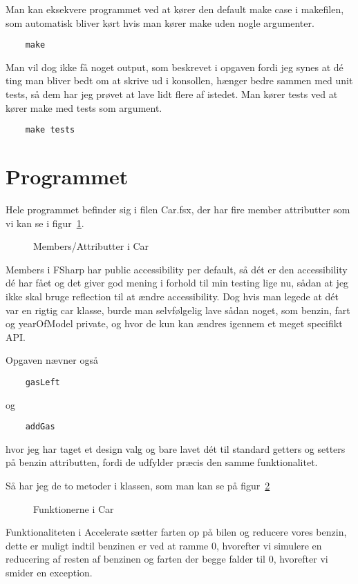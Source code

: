 Man kan eksekvere programmet ved at kører den default make case i makefilen,
som automatisk bliver kørt hvis man kører make uden nogle argumenter.
\begin{lstlisting}
    make
\end{lstlisting}
Man vil dog ikke få noget output,
som beskrevet i opgaven fordi jeg synes at dé ting man bliver bedt om at skrive ud i konsollen,
hænger bedre sammen med unit tests, så dem har jeg prøvet at lave lidt flere af istedet.
Man kører tests ved at kører make med tests som argument.
\begin{lstlisting}
    make tests
\end{lstlisting}

\section{Programmet}
Hele programmet befinder sig i filen Car.fsx, der har fire member attributter
som vi kan se i figur~\ref{fig:MemberAttributesInCar}.
\begin{figure}[!htb]
  \lstset{language=FSharp}
  \text{
    
  }
  \caption{Members/Attributter i Car}
\label{fig:MemberAttributesInCar}
\end{figure}

Members i FSharp har public accessibility per default, så dét er den accessibility dé har
fået og det giver god mening i forhold til min testing lige nu,
sådan at jeg ikke skal bruge reflection til at ændre accessibility.
Dog hvis man legede at dét var en rigtig car klasse,
burde man selvfølgelig lave sådan noget, som benzin,
fart og yearOfModel private, og hvor de kun kan ændres igennem et meget specifikt API.

Opgaven nævner også 

\begin{lstlisting}
    gasLeft
\end{lstlisting}

 og 

\begin{lstlisting}
    addGas
\end{lstlisting}

hvor jeg har taget et design valg
og bare lavet dét til standard getters og setters på benzin attributten,
fordi de udfylder præcis den samme funktionalitet.

Så har jeg de to metoder i klassen, som man kan se på figur~\ref{fig:MethodsInCar}
\begin{figure}[!htb]
  \lstset{language=FSharp}
  \text{
    
  }
  \caption{Funktionerne i Car}
\label{fig:MethodsInCar}
\end{figure}

Funktionaliteten i Accelerate sætter farten op på bilen og reducere vores benzin,
dette er muligt
indtil benzinen er ved at ramme 0, hvorefter vi simulere en reducering af resten
af benzinen og farten der begge falder til 0, hvorefter vi smider en exception.
